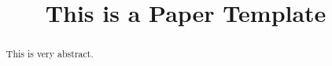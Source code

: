 \documentclass[letterpaper,twocolumn,10pt]{article}
\title{This is a Paper Template}
\author{}
\date{}
\begin{document}
\maketitle
\pagestyle{empty}

\begin{abstract}
	This is very abstract.
\end{abstract}







\appendix

\end{document}
